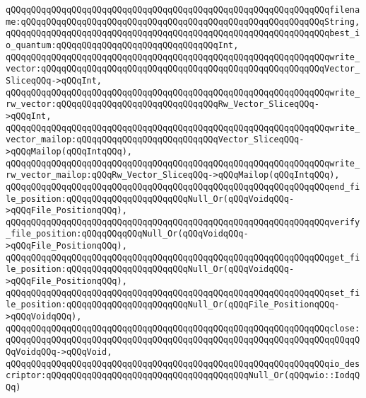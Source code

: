 \verb|qQQqqQQqqQQqqQQqqQQqqQQqqQQqqQQqqQQqqQQqqQQqqQQqqQQqqQQqqQQqqQQqfilename:qQQqqQQqqQQqqQQqqQQqqQQqqQQqqQQqqQQqqQQqqQQqqQQqqQQqqQQqqQQqString,|\newline
\verb|qQQqqQQqqQQqqQQqqQQqqQQqqQQqqQQqqQQqqQQqqQQqqQQqqQQqqQQqqQQqqQQqbest_io_quantum:qQQqqQQqqQQqqQQqqQQqqQQqqQQqqQQqInt,|\newline
\newline
\verb|qQQqqQQqqQQqqQQqqQQqqQQqqQQqqQQqqQQqqQQqqQQqqQQqqQQqqQQqqQQqqQQqwrite_vector:qQQqqQQqqQQqqQQqqQQqqQQqqQQqqQQqqQQqqQQqqQQqqQQqqQQqqQQqVector_SliceqQQq->qQQqInt,|\newline
\verb|qQQqqQQqqQQqqQQqqQQqqQQqqQQqqQQqqQQqqQQqqQQqqQQqqQQqqQQqqQQqqQQqwrite_rw_vector:qQQqqQQqqQQqqQQqqQQqqQQqqQQqqQQqRw_Vector_SliceqQQq->qQQqInt,|\newline
\newline
\verb|qQQqqQQqqQQqqQQqqQQqqQQqqQQqqQQqqQQqqQQqqQQqqQQqqQQqqQQqqQQqqQQqwrite_vector_mailop:qQQqqQQqqQQqqQQqqQQqqQQqqQQqVector_SliceqQQq->qQQqMailop(qQQqIntqQQq),|\newline
\verb|qQQqqQQqqQQqqQQqqQQqqQQqqQQqqQQqqQQqqQQqqQQqqQQqqQQqqQQqqQQqqQQqwrite_rw_vector_mailop:qQQqRw_Vector_SliceqQQq->qQQqMailop(qQQqIntqQQq),|\newline
\newline
\verb|qQQqqQQqqQQqqQQqqQQqqQQqqQQqqQQqqQQqqQQqqQQqqQQqqQQqqQQqqQQqqQQqend_file_position:qQQqqQQqqQQqqQQqqQQqqQQqNull_Or(qQQqVoidqQQq->qQQqFile_PositionqQQq),|\newline
\verb|qQQqqQQqqQQqqQQqqQQqqQQqqQQqqQQqqQQqqQQqqQQqqQQqqQQqqQQqqQQqqQQqverify_file_position:qQQqqQQqqQQqNull_Or(qQQqVoidqQQq->qQQqFile_PositionqQQq),|\newline
\newline
\verb|qQQqqQQqqQQqqQQqqQQqqQQqqQQqqQQqqQQqqQQqqQQqqQQqqQQqqQQqqQQqqQQqget_file_position:qQQqqQQqqQQqqQQqqQQqqQQqNull_Or(qQQqVoidqQQq->qQQqFile_PositionqQQq),|\newline
\verb|qQQqqQQqqQQqqQQqqQQqqQQqqQQqqQQqqQQqqQQqqQQqqQQqqQQqqQQqqQQqqQQqset_file_position:qQQqqQQqqQQqqQQqqQQqqQQqNull_Or(qQQqFile_PositionqQQq->qQQqVoidqQQq),|\newline
\newline
\verb|qQQqqQQqqQQqqQQqqQQqqQQqqQQqqQQqqQQqqQQqqQQqqQQqqQQqqQQqqQQqqQQqclose:qQQqqQQqqQQqqQQqqQQqqQQqqQQqqQQqqQQqqQQqqQQqqQQqqQQqqQQqqQQqqQQqqQQqqQQqVoidqQQq->qQQqVoid,|\newline
\verb|qQQqqQQqqQQqqQQqqQQqqQQqqQQqqQQqqQQqqQQqqQQqqQQqqQQqqQQqqQQqqQQqio_descriptor:qQQqqQQqqQQqqQQqqQQqqQQqqQQqqQQqqQQqqQQqNull_Or(qQQqwio::IodqQQq)|\newline
